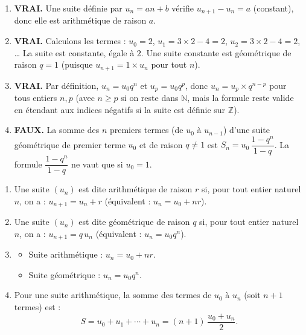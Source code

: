 \documentclass[11pt]{article}
\newcommand{\cle}[1]{{\popxbold\color{popdark}#1}}
\begin{document}
\begin{corrige}
\begin{enumerate}
\item \textbf{VRAI.} Une suite définie par $u_n = an+b$ vérifie $u_{n+1}-u_n = a$ (constant), donc elle est arithmétique de raison $a$.
\item \textbf{VRAI.} Calculons les termes : $u_0=2$, $u_1=3\times2-4=2$, $u_2=3\times2-4=2$, … La suite est constante, égale à $2$. Une suite constante est géométrique de raison $q=1$ (puisque $u_{n+1}=1\times u_n$ pour tout $n$).
\item \textbf{VRAI.} Par définition, $u_n = u_0 q^n$ et $u_p = u_0 q^p$, donc $u_n = u_p \times q^{n-p}$ pour tous entiers $n,p$ (avec $n\ge p$ si on reste dans $\mathbb{N}$, mais la formule reste valide en étendant aux indices négatifs si la suite est définie sur $\mathbb{Z}$).
\item \textbf{FAUX.} La somme des $n$ premiers termes (de $u_0$ à $u_{n-1}$) d'une suite géométrique de premier terme $u_0$ et de raison $q\neq1$ est $S_n = u_0\,\dfrac{1-q^n}{1-q}$. La formule $\dfrac{1-q^n}{1-q}$ ne vaut que si $u_0=1$.
\end{enumerate}
\end{corrige}

\begin{corrige}
\begin{enumerate}
\item Une suite $(u_n)$ est dite \cle{arithmétique} de raison $r$ si, pour tout entier naturel $n$, on a : $u_{n+1} = u_n + r$ (équivalent : $u_n = u_0 + nr$).
\item Une suite $(u_n)$ est dite \cle{géométrique} de raison $q$ si, pour tout entier naturel $n$, on a : $u_{n+1} = q\,u_n$ (équivalent : $u_n = u_0 q^n$).
\item \begin{itemize}
      \item Suite arithmétique : $u_n = u_0 + n r$.
      \item Suite géométrique : $u_n = u_0 q^n$.
    \end{itemize}
\item Pour une suite arithmétique, la somme des termes de $u_0$ à $u_n$ (soit $n+1$ termes) est :
  \[
  S = u_0 + u_1 + \cdots + u_n = (n+1)\,\frac{u_0+u_n}{2}.
  \]
\end{enumerate}
\end{corrige}
\end{document}
